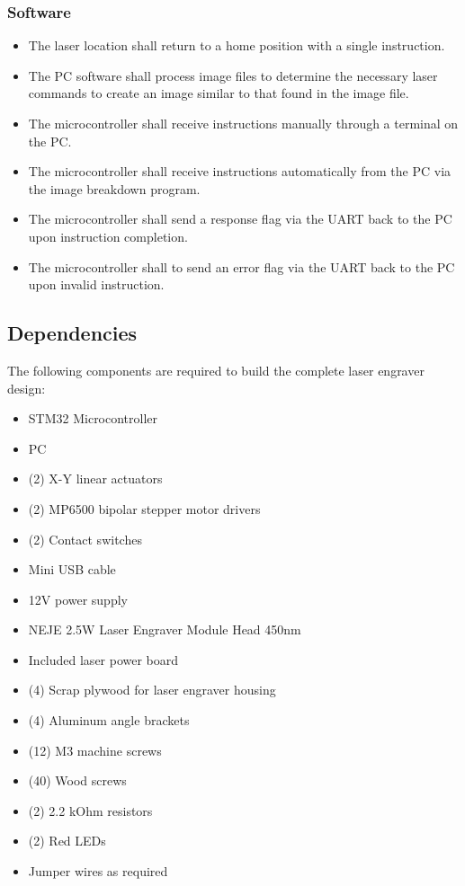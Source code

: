 \documentclass[11pt]{LaTeX-Classes/math-hw}
\begin{document}
\subsubsection*{Software}
	\begin{itemize}
		\item The laser location shall return to a home position with a single instruction.
		\item The PC software shall process image files to determine the necessary laser commands to create an image similar to that found in the image file.
		\item The microcontroller shall receive instructions manually through a terminal on the PC.
		\item The microcontroller shall receive instructions automatically from the PC via the image breakdown program.
		\item The microcontroller shall send a response flag via the UART back to the PC upon instruction completion.
		\item The microcontroller shall to send an error flag via the UART back to the PC upon invalid instruction.
	\end{itemize}

\subsection{Dependencies}
The following components are required to build the complete laser engraver design:
\begin{itemize}
	\item STM32 Microcontroller
	\item PC
	\item (2) X-Y linear actuators
	\item (2) MP6500 bipolar stepper motor drivers
	\item (2) Contact switches
	\item Mini USB cable
	\item 12V power supply
	\item NEJE 2.5W Laser Engraver Module Head 450nm 
	\item Included laser power board
	\item (4) Scrap plywood for laser engraver housing
	\item (4) Aluminum angle brackets
	\item (12) M3 machine screws
	\item (40) Wood screws
	\item (2) 2.2 kOhm resistors
	\item (2) Red LEDs
	\item Jumper wires as required
	\end{itemize}
\end{document}
